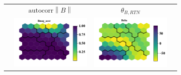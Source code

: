 \documentclass[border=0pt,varwidth=18cm,convert={outext=.jpg,density=300}]{standalone}%
\begin{document}
\begin{figure}[h!]
\begin{tabular}{CCCC}
		\\
		& $\text{autocorr} \left\lVert B \right\rVert$ & $\theta_{B,RTN}$ & \\
		& \includegraphics[width=4cm]{Amaya/comp-map-Bmag_acor} &
		\includegraphics[width=4cm]{Amaya/comp-map-Delta} & \hfill
		\\
	\end{tabular}
\end{figure}
\end{document}

